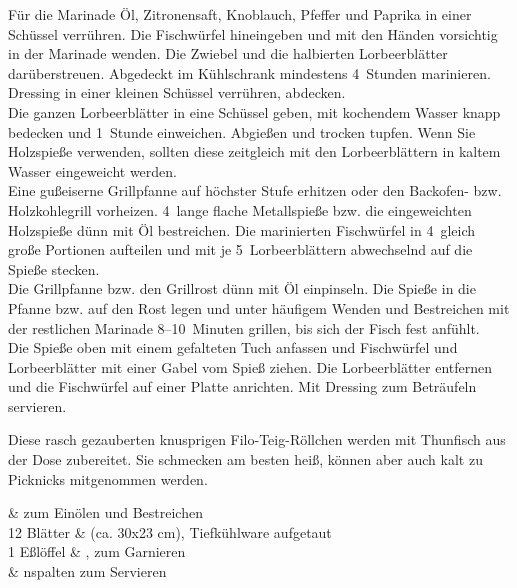       \begin{zubereitung}
        Für die Marinade Öl, Zitronensaft, Knoblauch, Pfeffer und Paprika in
	einer Schüssel verrühren. Die Fischwürfel hineingeben und mit den Händen
	vorsichtig in der Marinade wenden. Die Zwiebel und die halbierten
	Lorbeerblätter darüberstreuen. Abgedeckt im Kühlschrank mindestens
	4~Stunden marinieren. \\
	Dressing in einer kleinen Schüssel verrühren, abdecken. \\
	Die ganzen Lorbeerblätter in eine Schüssel geben, mit kochendem Wasser
	knapp bedecken und 1~Stunde einweichen. Abgießen und trocken tupfen.
	Wenn Sie Holzspieße verwenden, sollten diese zeitgleich mit den
	Lorbeerblättern in kaltem Wasser eingeweicht werden. \\
	Eine gußeiserne Grillpfanne auf höchster Stufe erhitzen oder den
	Backofen- bzw. Holzkohlegrill vorheizen. 4~lange flache Metallspieße
	bzw. die eingeweichten Holzspieße dünn mit Öl bestreichen. Die
	marinierten Fischwürfel in 4~gleich große Portionen aufteilen und mit je
	5~Lorbeerblättern abwechselnd auf die Spieße stecken. \\
	Die Grillpfanne bzw. den Grillrost dünn mit Öl einpinseln. Die Spieße
	in die Pfanne bzw. auf den Rost legen und unter häufigem Wenden und
	Bestreichen mit der restlichen Marinade 8--10~Minuten grillen, bis sich
	der Fisch fest anfühlt. \\
	Die Spieße oben mit einem gefalteten Tuch anfassen und Fischwürfel und
	Lorbeerblätter mit einer Gabel vom Spieß ziehen. Die Lorbeerblätter
	entfernen und die Fischwürfel auf einer Platte anrichten. Mit Dressing
	zum Beträufeln servieren. \\
      \end{zubereitung}


      \begin{einleitung}
        Diese rasch gezauberten knusprigen Filo-Teig-Röllchen werden mit
	Thunfisch aus der Dose zubereitet. Sie schmecken am besten heiß, können
	aber auch kalt zu Picknicks mitgenommen werden. \\
      \end{einleitung}

      \begin{zutaten}
	&  zum Einölen und Bestreichen
	  \\
	12 Blätter &  (ca. 30x23 cm), Tiefkühlware
	             aufgetaut \\
	1 Eßlöffel & , zum Garnieren \\
	& nspalten zum Servieren \\
      \end{zutaten}


